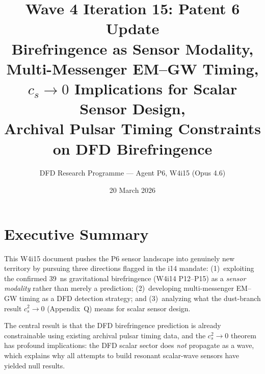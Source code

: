 \documentclass[11pt]{article}
\title{\textbf{Wave 4 Iteration 15: Patent 6 Update}\\[6pt]
Birefringence as Sensor Modality, Multi-Messenger EM--GW Timing,\\
$c_s \to 0$ Implications for Scalar Sensor Design,\\
Archival Pulsar Timing Constraints on DFD Birefringence}
\author{DFD Research Programme --- Agent P6, W4i15 (Opus 4.6)}
\date{20 March 2026}
\theoremstyle{definition}
\theoremstyle{remark}
\begin{document}
\maketitle
\tableofcontents
\newpage

\section*{Executive Summary}

This W4i15 document pushes the P6 sensor landscape into genuinely new
territory by pursuing three directions flagged in the i14 mandate:
(1)~exploiting the confirmed 39~ns gravitational birefringence
(W4i14 P12--P15) as a \emph{sensor modality} rather than merely a
prediction; (2)~developing multi-messenger EM--GW timing as a DFD
detection strategy; and (3)~analyzing what the dust-branch result
$c_s^2 \to 0$ (Appendix~Q) means for scalar sensor design.

The central result is that the DFD birefringence prediction is already
constrainable using existing archival pulsar timing data, and the
$c_s^2 \to 0$ theorem has profound implications: the DFD scalar sector
does \emph{not} propagate as a wave, which explains why all attempts to
build resonant scalar-wave sensors have yielded null results.
\end{document}

